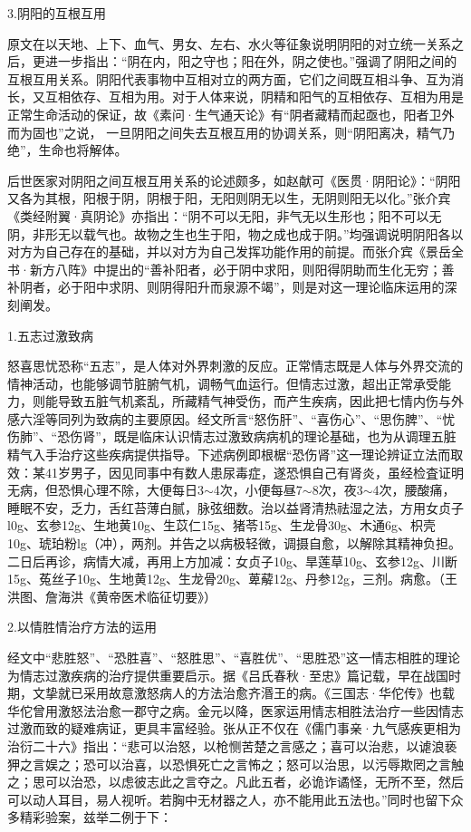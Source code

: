 \documentclass[12pt]{ctexbook}
\begin{document}
3.阴阳的互根互用

原文在以天地、上下、血气、男女、左右、水火等征象说明阴阳的对立统一关系之后，更进一步指出：“阴在内，阳之守也；阳在外，阴之使也。”强调了阴阳之间的互根互用关系。阴阳代表事物中互相对立的两方面，它们之间既互相斗争、互为消长，又互相依存、互相为用。对于人体来说，阴精和阳气的互相依存、互相为用是正常生命活动的保证，故《素问·生气通天论》有“阴者藏精而起亟也，阳者卫外而为固也”之说，
一旦阴阳之间失去互根互用的协调关系，则“阴阳离决，精气乃绝”，生命也将解体。

后世医家对阴阳之间互根互用关系的论述颇多，如赵献可《医贯·阴阳论》：“阴阳又各为其根，阳根于阴，阴根于阳，无阳则阴无以生，无阴则阳无以化。”张介宾《类经附翼·真阴论》亦指出：“阴不可以无阳，非气无以生形也；阳不可以无阴，非形无以载气也。故物之生也生于阳，物之成也成于阴。”均强调说明阴阳各以对方为自己存在的基础，并以对方为自己发挥功能作用的前提。而张介宾《景岳全书·新方八阵》中提出的“善补阳者，必于阴中求阳，则阳得阴助而生化无穷；善补阴者，必于阳中求阴、则阴得阳升而泉源不竭”，则是对这一理论临床运用的深刻阐发。


1.五志过激致病

怒喜思忧恐称“五志”，是人体对外界刺激的反应。正常情志既是人体与外界交流的情神活动，也能够调节脏腑气机，调畅气血运行。但情志过激，超出正常承受能力，则能导致五脏气机紊乱，所藏精气神受伤，而产生疾病，因此把七情内伤与外感六淫等同列为致病的主要原因。经文所言“怒伤肝”、“喜伤心”、“思伤脾”、“忧伤肺”、“恐伤肾”，既是临床认识情志过激致病病机的理论基础，也为从调理五脏精气入手治疗这些疾病提供指导。下述病例即根椐“恐伤肾”这一理论辨证立法而取效：某41岁男子，因见同事中有数人患尿毒症，遂恐惧自己有肾炎，虽经检査证明无病，但恐惧心理不除，大便每日3$\sim$4次，小便每昼7$\sim$8次，夜3$\sim$4次，腰酸痛，睡眠不安，乏力，舌红苔薄白腻，脉弦细数。治以益肾清热祛湿之法，方用女贞子l0g、玄参12g、生地黄10g、生苡仁15g、猪苓15g、生龙骨30g、木通6g、枳壳10g、琥珀粉lg（冲），两剂。并告之以病极轻微，调摄自愈，以解除其精神负担。二日后再诊，病情大减，再用上方加减：女贞子10g、旱莲草10g、玄参12g、川断15g、菟丝子10g、生地黄12g、生龙骨20g、萆薢12g、丹参12g，三剂。病愈。（王洪图、詹海洪《黄帝医术临征切要》）

2.以情胜情治疗方法的运用

经文中“悲胜怒”、“恐胜喜”、“怒胜思”、“喜胜优”、“思胜恐”这一情志相胜的理论为情志过激疾病的治疗提供重要启示。据《吕氏春秋·至忠》篇记载，早在战国时期，文挚就已采用故意激怒病人的方法治愈齐湣王的病。《三国志·华佗传》也载华佗曾用激怒法治愈一郡守之病。金元以降，医家运用情志相胜法治疗一些因情志过激而致的疑难病证，更具丰富经验。张从正不仅在《儒门事亲·九气感疾更相为治衍二十六》指出：“悲可以治怒，以枪恻苦楚之言感之；喜可以治悲，以谑浪亵狎之言娱之；恐可以治喜，以恐惧死亡之言怖之；怒可以治思，以污辱欺罔之言触之；思可以治恐，以虑彼志此之言夺之。凡此五者，必诡诈谲怪，无所不至，然后可以动人耳目，易人视听。若胸中无材器之人，亦不能用此五法也。”同时也留下众多精彩验案，兹举二例于下：
\end{document}
